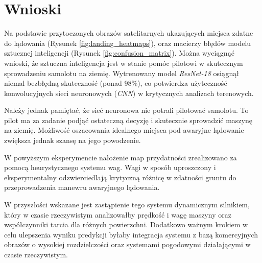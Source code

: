 \documentclass[12pt, a4paper]{report}
\begin{document}
\chapter{Wnioski}
Na podstawie przytoczonych obrazów satelitarnych ukazujących miejsca zdatne do lądowania (Rysunek \ref{fig:landing_heatmaps}), oraz macierzy błędów modelu sztucznej inteligencji (Rysunek \ref{fig:confusion_matrix}). Można wyciągnąć wnioski, że sztuczna inteligencja jest w stanie pomóc pilotowi w skutecznym sprowadzeniu samolotu na ziemię. Wytrenowany model \emph{ResNet-18} osiągnął niemal bezbłędną skuteczność (ponad 98\%), co potwierdza użyteczność konwolucyjnych sieci neuronowych (\emph{CNN}) w krytycznych analizach terenowych.
\par Należy jednak pamiętać, że sieć neuronowa nie potrafi pilotować samolotu. To pilot ma za zadanie podjąć ostateczną decyzję i skutecznie sprowadzić maszynę na ziemię. Możliwość oszacowania idealnego miejsca pod awaryjne lądowanie zwiększa jednak szansę na jego powodzenie.
\par W powyższym eksperymencie nałożenie map przydatności zrealizowano za pomocą heurystycznego systemu wag. Wagi w sposób uproszczony i eksperymentalny odzwierciedlają krytyczną różnicę w zdatności gruntu do przeprowadzenia manewru awaryjnego lądowania. 
\par W przyszłości wskazane jest zastąpienie tego systemu dynamicznym silnikiem, który w czasie rzeczywistym analizowałby prędkość i wagę maszyny oraz współczynniki tarcia dla różnych powierzchni. Dodatkowo ważnym krokiem w celu ulepszenia wyniku predykcji byłaby integracja systemu z bazą komercyjnych obrazów o wysokiej rozdzielczości oraz systemami pogodowymi działającymi w czasie rzeczywistym.
\end{document}
